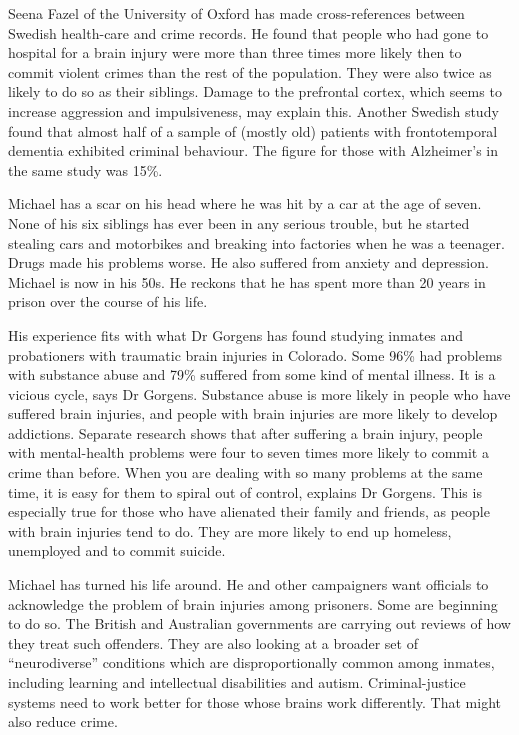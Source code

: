 \documentclass{article}
\begin{document}
Seena Fazel of the University of Oxford has made cross-references between Swedish health-care and crime records. He found that people who had gone to hospital for a brain injury were more than three times more likely then to commit violent crimes than the rest of the population. They were also twice as likely to do so as their siblings. Damage to the prefrontal cortex, which seems to increase aggression and impulsiveness, may explain this. Another Swedish study found that almost half of a sample of (mostly old) patients with frontotemporal dementia exhibited criminal behaviour. The figure for those with Alzheimer's in the same study was 15\%. 

Michael has a scar on his head where he was hit by a car at the age of seven. None of his six siblings has ever been in any serious trouble, but he started stealing cars and motorbikes and breaking into factories when he was a teenager. Drugs made his problems worse. He also suffered from anxiety and depression. Michael is now in his 50s. He reckons that he has spent more than 20 years in prison over the course of his life. 

His experience fits with what Dr Gorgens has found studying inmates and probationers with traumatic brain injuries in Colorado. Some 96\% had problems with substance abuse and 79\% suffered from some kind of mental illness. It is a vicious cycle, says Dr Gorgens. Substance abuse is more likely in people who have suffered brain injuries, and people with brain injuries are more likely to develop addictions. Separate research shows that after suffering a brain injury, people with mental-health problems were four to seven times more likely to commit a crime than before. When you are dealing with so many problems at the same time, it is easy for them to spiral out of control, explains Dr Gorgens. This is especially true for those who have alienated their family and friends, as people with brain injuries tend to do. They are more likely to end up homeless, unemployed and to commit suicide. 

Michael has turned his life around. He and other campaigners want officials to acknowledge the problem of brain injuries among prisoners. Some are beginning to do so. The British and Australian governments are carrying out reviews of how they treat such offenders. They are also looking at a broader set of ``neurodiverse'' conditions which are disproportionally common among inmates, including learning and intellectual disabilities and autism. Criminal-justice systems need to work better for those whose brains work differently. That might also reduce crime. 
\end{document}
